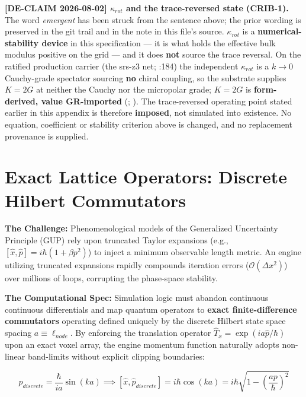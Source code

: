 \noindent\textbf{[DE-CLAIM 2026-08-02] $\kappa_{rot}$ and the trace-reversed state (CRIB-1).} The word \emph{emergent} has been struck from the sentence above; the prior wording is preserved in the git trail and in the note in this file's source. $\kappa_{rot}$ is a \textbf{numerical-stability device} in this specification --- it is what holds the effective bulk modulus positive on the grid --- and it does \textbf{not} source the trace reversal. On the ratified production carrier (the srs-z3 net; :184) the independent $\kappa_{rot}$ is a $k \to 0$ Cauchy-grade spectator sourcing \textbf{no} chiral coupling, so the substrate supplies $K = 2G$ at neither the Cauchy nor the micropolar grade; $K = 2G$ is \textbf{form-derived, value GR-imported} (; ). The trace-reversed operating point stated earlier in this appendix is therefore \textbf{imposed}, not simulated into existence. No equation, coefficient or stability criterion above is changed, and no replacement provenance is supplied.

\section{Exact Lattice Operators: Discrete Hilbert Commutators}

\textbf{The Challenge:} Phenomenological models of the Generalized Uncertainty Principle (GUP) rely upon truncated Taylor expansions (e.g., $[\hat{x}, \hat{p}] = i\hbar(1 + \beta p^2)$) to inject a minimum observable length metric. An engine utilizing truncated expansions rapidly compounds iteration errors ($\mathcal{O}(\Delta x^2)$) over millions of loops, corrupting the phase-space stability.

\textbf{The Computational Spec:} Simulation logic must abandon continuous continuous differentials and map quantum operators to \textbf{exact finite-difference commutators} operating defined uniquely by the discrete Hilbert state space spacing $a \equiv \ell_{node}$. By enforcing the translation operator $\hat{T}_x = \exp(i a \hat{p} / \hbar)$ upon an exact voxel array, the engine momentum function naturally adopts non-linear band-limits without explicit clipping boundaries:

\begin{equation}
    \hat{p}_{discrete} = \frac{\hbar}{i a} \sin(k a) \implies [\hat{x}, \hat{p}_{discrete}] = i\hbar \cos(k a) = i\hbar \sqrt{1 - \left(\frac{a p}{\hbar}\right)^2}
\end{equation}


